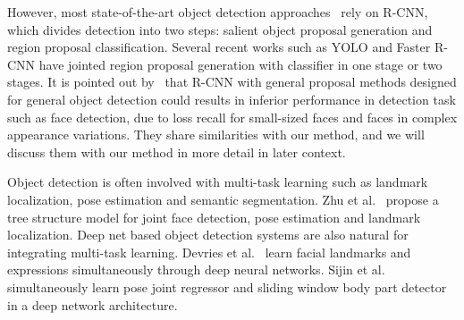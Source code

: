 However, most state-of-the-art object detection approaches~\cite{ouyang2014deepid, li2015convolutional, erhan2014scalable,girshick2015fast,yan2015object} rely on R-CNN, which divides detection into two steps: salient object proposal generation and region proposal classification. Several recent works such as YOLO and Faster R-CNN have jointed region proposal generation with classifier in one stage or two stages. It is pointed out by~\cite{farfade2015multi} that R-CNN with general proposal methods designed for general object detection could results in inferior performance in detection task such as face detection, due to loss recall for small-sized faces and faces in complex appearance variations. They share similarities with our method, and we will discuss them with our method in more detail in later context.  

Object detection is often involved with multi-task learning such as landmark localization, pose estimation and semantic segmentation. Zhu et al.~\cite{zhu2012face} propose a tree structure model for joint face detection, pose estimation and landmark localization. Deep net based object detection systems are also natural for integrating multi-task learning. Devries et al.~\cite{devries2014multi} learn facial landmarks and expressions simultaneously through deep neural networks. Sijin et al.~\cite{li2014heterogeneous} simultaneously learn pose joint regressor and sliding window body part detector in a deep network architecture. 
